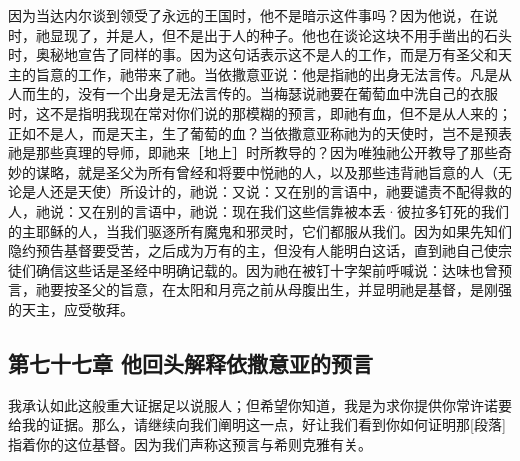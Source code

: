 因为当达内尔谈到领受了永远的王国时，他不是暗示这件事吗？因为他说，在说时，祂显现了，并是人，但不是出于人的种子。他也在谈论这块不用手凿出的石头时，奥秘地宣告了同样的事。因为这句话表示这不是人的工作，而是万有圣父和天主的旨意的工作，祂带来了祂。当依撒意亚说：他是指祂的出身无法言传。凡是从人而生的，没有一个出身是无法言传的。当梅瑟说祂要在葡萄血中洗自己的衣服时，这不是指明我现在常对你们说的那模糊的预言，即祂有血，但不是从人来的；正如不是人，而是天主，生了葡萄的血？当依撒意亚称祂为的天使时，岂不是预表祂是那些真理的导师，即祂来［地上］时所教导的？因为唯独祂公开教导了那些奇妙的谋略，就是圣父为所有曾经和将要中悦祂的人，以及那些违背祂旨意的人（无论是人还是天使）所设计的，祂说：又说：又在别的言语中，祂要谴责不配得救的人，祂说：又在别的言语中，祂说：现在我们这些信靠被本丢·彼拉多钉死的我们的主耶稣的人，当我们驱逐所有魔鬼和邪灵时，它们都服从我们。因为如果先知们隐约预告基督要受苦，之后成为万有的主，但没有人能明白这话，直到祂自己使宗徒们确信这些话是圣经中明确记载的。因为祂在被钉十字架前呼喊说：达味也曾预言，祂要按圣父的旨意，在太阳和月亮之前从母腹出生，并显明祂是基督，是刚强的天主，应受敬拜。\par


\subsection{第七十七章 他回头解释依撒意亚的预言}

我承认如此这般重大证据足以说服人；但希望你知道，我是为求你提供你常许诺要给我的证据。那么，请继续向我们阐明这一点，好让我们看到你如何证明那[段落]指着你的这位基督。因为我们声称这预言与希则克雅有关。\par

